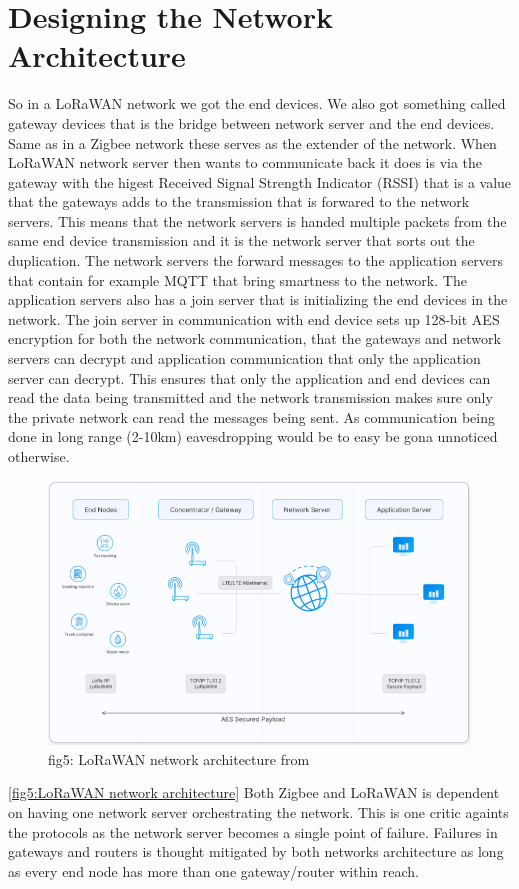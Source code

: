 \documentclass[article,a4paper]{IEEEtran}
\begin{document}
    \section{Designing the Network Architecture}
    So in a LoRaWAN network we got the end devices. We also got something called gateway devices that is the bridge between network server and the end devices. Same as in a Zigbee network these serves as the extender of the network. When LoRaWAN network server then wants to communicate back it does is via the gateway with the higest Received Signal Strength Indicator (RSSI) that is a value that the gateways adds to the transmission that is forwared to the network servers. This means that the network servers is handed multiple packets from the same end device transmission and it is the network server that sorts out the duplication. The network servers the forward messages to the application servers that contain for example MQTT that bring smartness to the network. The application servers also has a join server that is initializing the end devices in the network. The join server in communication with end device sets up 128-bit AES encryption for both the network communication, that the gateways and network servers can decrypt and application communication that only the application server can decrypt. This ensures that only the application and end devices can read the data being transmitted and the network transmission makes sure only the private network can read the messages being sent. As communication being done in long range (2-10km) eavesdropping would be to easy be gona unnoticed otherwise. 
    \begin{figure}
        \includegraphics[width=\columnwidth]{LoRaWANnetwork.png} 
        \caption{ fig5: LoRaWAN network architecture from \cite{LoRaWANarchi} }
        \label{fig5:LoRaWAN network architecture }   
    \end{figure}
    \ref{fig5:LoRaWAN network architecture} 
    \newline\newline
    Both Zigbee and LoRaWAN is dependent on having one network server orchestrating the network. This is one critic againts the protocols as the network server becomes a single point of failure. Failures in gateways and routers is thought mitigated by both networks architecture as long as every end node has more than one gateway/router within reach.    
\end{document}
